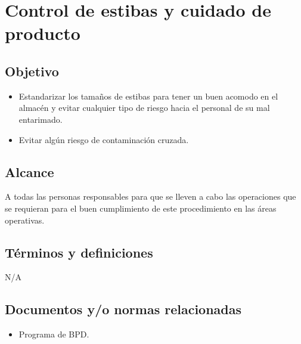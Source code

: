 \thispagestyle{formato-PI}
\renewcommand{\MayorVer}{2}
\renewcommand{\MenorVer}{0}
\renewcommand{\Codigo}{PSA-1-PROG} %
\renewcommand{\FechaPub}{2023--01}
\renewcommand{\Titulo}{Control de estibas y cuidado de producto}

\section{\Titulo}
\label{ESP-ControlDeEstibas}


\subsection{Objetivo}

\begin{itemize}
	\item Estandarizar los tamaños de estibas para tener un buen acomodo en el almacén y evitar cualquier tipo de riesgo hacia el personal de su mal entarimado.
	\item Evitar algún riesgo de contaminación cruzada.
\end{itemize}

\subsection{Alcance}

A todas las personas responsables para que se lleven a cabo las operaciones que se requieran para el buen cumplimiento de este procedimiento en las áreas operativas.

\subsection{Términos y definiciones}

N/A

\subsection{Documentos y/o normas relacionadas}

\begin{itemize}
	\item Programa de \gls{BPD}.
\end{itemize}

